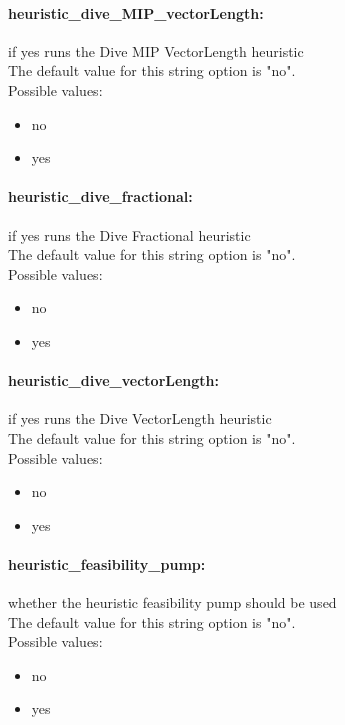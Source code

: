 \paragraph{heuristic\_dive\_MIP\_vectorLength:}\label{opt:heuristic_dive_MIP_vectorLength} if yes runs the Dive MIP VectorLength heuristic \\
 The default value for this string option is "no".
\\ 
Possible values:
\begin{itemize}
   \item no
   \item yes
\end{itemize}

\paragraph{heuristic\_dive\_fractional:}\label{opt:heuristic_dive_fractional} if yes runs the Dive Fractional heuristic \\
 The default value for this string option is "no".
\\ 
Possible values:
\begin{itemize}
   \item no
   \item yes
\end{itemize}

\paragraph{heuristic\_dive\_vectorLength:}\label{opt:heuristic_dive_vectorLength} if yes runs the Dive VectorLength heuristic \\
 The default value for this string option is "no".
\\ 
Possible values:
\begin{itemize}
   \item no
   \item yes
\end{itemize}

\paragraph{heuristic\_feasibility\_pump:}\label{opt:heuristic_feasibility_pump} whether the heuristic feasibility pump should be used \\
 The default value for this string option is "no".
\\ 
Possible values:
\begin{itemize}
   \item no
   \item yes
\end{itemize}

